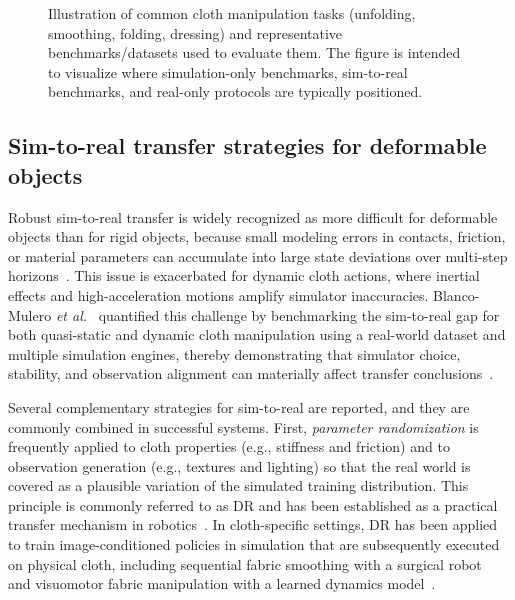 \begin{figure}[ht!]
\centering
{}
\caption[Taxonomy of cloth manipulation tasks]{Illustration of common cloth manipulation tasks (unfolding, smoothing, folding, dressing) and representative benchmarks/datasets used to evaluate them. The figure is intended to visualize where simulation-only benchmarks, sim-to-real benchmarks, and real-only protocols are typically positioned.}\label{fig:cloth_task_taxonomy_benchmarks}
\end{figure}

\subsection{Sim-to-real transfer strategies for deformable objects}

Robust sim-to-real transfer is widely recognized as more difficult for deformable objects than for rigid objects, because small modeling errors in contacts, friction, or material parameters can accumulate into large state deviations over multi-step horizons~\cite{Gu2023DeformableSurvey,Longhini2025ClothReview}. This issue is exacerbated for dynamic cloth actions, where inertial effects and high-acceleration motions amplify simulator inaccuracies. Blanco-Mulero \emph{et al.}~\cite{BlancoMulero2024Sim2RealGap} quantified this challenge by benchmarking the sim-to-real gap for both quasi-static and dynamic cloth manipulation using a real-world dataset and multiple simulation engines, thereby demonstrating that simulator choice, stability, and observation alignment can materially affect transfer conclusions~\cite{BlancoMulero2024Sim2RealGap}.

Several complementary strategies for sim-to-real are reported, and they are commonly combined in successful systems. First, \emph{parameter randomization} is frequently applied to cloth properties (e.g., stiffness and friction) and to observation generation (e.g., textures and lighting) so that the real world is covered as a plausible variation of the simulated training distribution. This principle is commonly referred to as \ac{DR} and has been established as a practical transfer mechanism in robotics~\cite{Tobin2017DomainRandomization}. In cloth-specific settings, \ac{DR} has been applied to train image-conditioned policies in simulation that are subsequently executed on physical cloth, including sequential fabric smoothing with a surgical robot~\cite{Seita2020FabricSmoothing} and visuomotor fabric manipulation with a learned dynamics model~\cite{Hoque2020VisuoSpatialForesight}.

